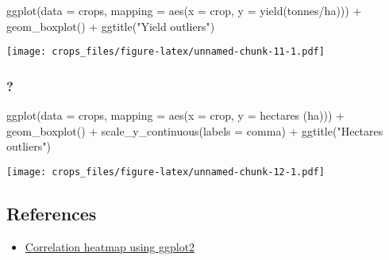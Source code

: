 \documentclass[
]{article}
\newenvironment{Shaded}{\begin{snugshade}}{\end{snugshade}}
\newcommand{\AttributeTok}[1]{\textcolor[rgb]{0.77,0.63,0.00}{#1}}
\newcommand{\FunctionTok}[1]{\textcolor[rgb]{0.00,0.00,0.00}{#1}}
\newcommand{\NormalTok}[1]{#1}
\newcommand{\SpecialCharTok}[1]{\textcolor[rgb]{0.00,0.00,0.00}{#1}}
\newcommand{\StringTok}[1]{\textcolor[rgb]{0.31,0.60,0.02}{#1}}
\providecommand{\tightlist}{%
  \setlength{\itemsep}{0pt}\setlength{\parskip}{0pt}}
\begin{document}
\begin{Shaded}
\begin{Highlighting}[]
\FunctionTok{ggplot}\NormalTok{(}\AttributeTok{data =}\NormalTok{ crops, }\AttributeTok{mapping =} \FunctionTok{aes}\NormalTok{(}\AttributeTok{x =}\NormalTok{ crop, }\AttributeTok{y =} \StringTok{\textasciigrave{}}\AttributeTok{yield(tonnes/ha)}\StringTok{\textasciigrave{}}\NormalTok{)) }\SpecialCharTok{+}
  \FunctionTok{geom\_boxplot}\NormalTok{() }\SpecialCharTok{+}
  \FunctionTok{ggtitle}\NormalTok{(}\StringTok{"Yield outliers"}\NormalTok{)}
\end{Highlighting}
\end{Shaded}

\texttt{[image: crops\_files/figure-latex/unnamed-chunk-11-1.pdf]}

\hypertarget{section}{%
\subsubsection{?}\label{section}}

\begin{Shaded}
\begin{Highlighting}[]
\FunctionTok{ggplot}\NormalTok{(}\AttributeTok{data =}\NormalTok{ crops, }\AttributeTok{mapping =} \FunctionTok{aes}\NormalTok{(}\AttributeTok{x =}\NormalTok{ crop, }\AttributeTok{y =} \StringTok{\textasciigrave{}}\AttributeTok{hectares (ha)}\StringTok{\textasciigrave{}}\NormalTok{)) }\SpecialCharTok{+}
  \FunctionTok{geom\_boxplot}\NormalTok{() }\SpecialCharTok{+}
  \FunctionTok{scale\_y\_continuous}\NormalTok{(}\AttributeTok{labels =}\NormalTok{ comma) }\SpecialCharTok{+}
  \FunctionTok{ggtitle}\NormalTok{(}\StringTok{"Hectares outliers"}\NormalTok{)}
\end{Highlighting}
\end{Shaded}

\texttt{[image: crops\_files/figure-latex/unnamed-chunk-12-1.pdf]}

\hypertarget{references}{%
\subsection{References}\label{references}}

\begin{itemize}
\tightlist
\item
  \href{http://www.sthda.com/english/wiki/ggcorrplot-visualization-of-a-correlation-matrix-using-ggplot2}{Correlation
  heatmap using ggplot2}
\end{itemize}
\end{document}
